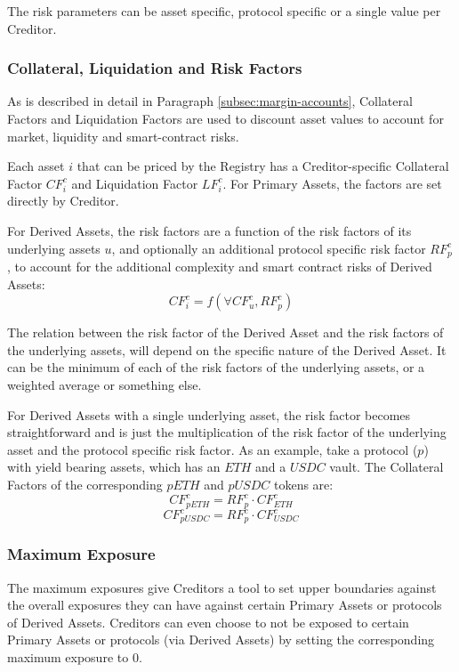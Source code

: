 \documentclass[sigconf,nonacm]{acmart}
\begin{document}
The risk parameters can be asset specific, protocol specific or a single value per Creditor.

\subsubsection{Collateral, Liquidation and Risk Factors}
As is described in detail in Paragraph \ref{subsec:margin-accounts}, Collateral Factors and Liquidation Factors are used to discount asset values to account for market, liquidity and smart-contract risks.

Each asset $i$ that can be priced by the Registry has a Creditor-specific Collateral Factor $CF_{i}^{c}$ and Liquidation Factor $LF_{i}^{c}$.
For Primary Assets, the factors are set directly by Creditor.

For Derived Assets, the risk factors are a function of the risk factors of its underlying assets $u$, and optionally an additional protocol specific risk factor $RF_{p}^{c}$,
to account for the additional complexity and smart contract risks of Derived Assets:
\begin{equation}
    CF_{i}^{c} = f(\forall CF_{u}^{c}, RF_{p}^{c})
\end{equation}

The relation between the risk factor of the Derived Asset and the risk factors of the underlying assets,
will depend on the specific nature of the Derived Asset.
It can be the minimum of each of the risk factors of the underlying assets, or a weighted average or something else.

For Derived Assets with a single underlying asset,
the risk factor becomes straightforward and is just the multiplication of the risk factor of the underlying asset and the protocol specific risk factor.
As an example, take a protocol ($p$) with yield bearing assets, which has an $ETH$ and a $USDC$ vault.
The Collateral Factors of the corresponding $pETH$ and $pUSDC$ tokens are:
\begin{equation}
    CF_{pETH}^{c} = RF_{p}^{c} \cdot CF_{ETH}^{c}
\end{equation}
\begin{equation}
    CF_{pUSDC}^{c} = RF_{p}^{c} \cdot CF_{USDC}^{c}
\end{equation}

\subsubsection{Maximum Exposure}
The maximum exposures give Creditors a tool to set upper boundaries against the overall exposures they can have against certain Primary Assets or protocols of Derived Assets.
Creditors can even choose to not be exposed to certain Primary Assets or protocols (via Derived Assets) by setting the corresponding maximum exposure to 0.
\end{document}
